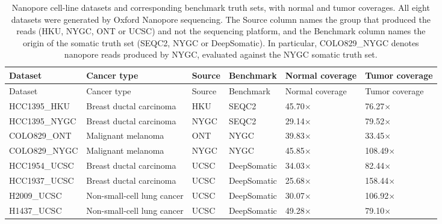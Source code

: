 \documentclass[pdflatex,sn-nature]{sn-jnl}
\begin{document}
{\small
\begin{longtable}{@{}llllll@{}}
  \caption[Nanopore cell-line datasets and benchmark sources with coverage]%
  {Nanopore cell-line datasets and corresponding benchmark truth sets, with normal and tumor coverages. All eight datasets were generated by Oxford Nanopore sequencing. The Source column names the group that produced the reads (HKU, NYGC, ONT or UCSC) and not the sequencing platform, and the Benchmark column names the origin of the somatic truth set (SEQC2, NYGC or DeepSomatic). In particular, COLO829\_NYGC denotes nanopore reads produced by NYGC, evaluated against the NYGC somatic truth set.}
  \label{tab:cell-line-datasets-and-benchmark-sources}\\
  \toprule
  Dataset & Cancer type & Source & Benchmark & Normal coverage & Tumor coverage \\
  \midrule
  \endfirsthead
  \toprule
  Dataset & Cancer type & Source & Benchmark & Normal coverage & Tumor coverage \\
  \midrule
  \endhead
  \bottomrule
  \endlastfoot
  HCC1395\_HKU   & Breast ductal carcinoma                & HKU  & SEQC2       & 45.70$\times$ & 76.27$\times$ \\
  HCC1395\_NYGC  & Breast ductal carcinoma                & NYGC & SEQC2       & 29.14$\times$ & 79.52$\times$ \\
  COLO829\_ONT   & Malignant melanoma                     & ONT  & NYGC        & 39.83$\times$ & 33.45$\times$ \\
  COLO829\_NYGC  & Malignant melanoma                     & NYGC & NYGC        & 45.85$\times$ & 108.49$\times$ \\
  HCC1954\_UCSC  & Breast ductal carcinoma                & UCSC & DeepSomatic & 34.03$\times$ & 82.44$\times$ \\
  HCC1937\_UCSC  & Breast ductal carcinoma                & UCSC & DeepSomatic & 25.68$\times$ & 158.44$\times$ \\
  H2009\_UCSC    & Non-small-cell lung cancer             & UCSC & DeepSomatic & 30.07$\times$ & 106.92$\times$ \\
  H1437\_UCSC    & Non-small-cell lung cancer             & UCSC & DeepSomatic & 49.28$\times$ & 79.10$\times$ \\
\end{longtable}
}
\end{document}

